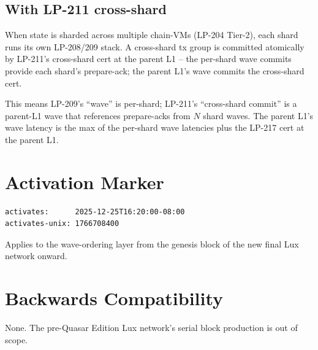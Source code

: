 \subsection{With LP-211 cross-shard}

When state is sharded across multiple chain-VMs (LP-204 Tier-2),
each shard runs its own LP-208/209 stack. A cross-shard tx group is
committed atomically by LP-211's cross-shard cert at the parent L1
-- the per-shard wave commits provide each shard's prepare-ack; the
parent L1's wave commits the cross-shard cert.

This means LP-209's ``wave'' is per-shard; LP-211's ``cross-shard
commit'' is a parent-L1 wave that references prepare-acks from $N$
shard waves. The parent L1's wave latency is the max of the
per-shard wave latencies plus the LP-217 cert at the parent L1.

\section{Activation Marker}

\begin{verbatim}
activates:      2025-12-25T16:20:00-08:00
activates-unix: 1766708400
\end{verbatim}

Applies to the wave-ordering layer from the genesis block of the
new final Lux network onward.

\section{Backwards Compatibility}

None. The pre-Quasar Edition Lux network's serial block production
is out of scope.
